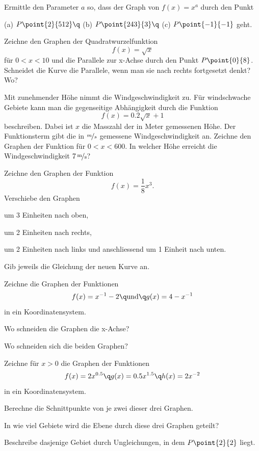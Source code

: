 \documentclass[%
11pt,%
twoside,%
titlepage,%
german,%
headsepline%
]{scrartcl}
\begin{document}
\begin{ueb}[Wurzeln]
Ermittle den Parameter $a$ so, dass der Graph von $f(x)=x^a$ durch den Punkt

(a) $P\point{2}{512}\q$ (b) $P\point{243}{3}\q$ (c) $P\point{-1}{-1}$
geht.
\end{ueb}

\begin{ueb}[Graphen 3]
Zeichne den Graphen der Quadratwurzelfunktion
$$f(x)=\sqrt{x}$$
für $0<x<10$ und die Parallele zur x-Achse durch den Punkt $P\point{0}{8}$. Schneidet die Kurve die Parallele, wenn man sie nach rechts fortgesetzt denkt? Wo?
\end{ueb}

\begin{ueb}[Wind]
Mit zunehmender Höhe nimmt die Windgeschwindigkeit zu. Für windschwache Gebiete kann man die gegenseitige Abhängigkeit durch die Funktion
$$f(x)=0.2\sqrt{x}+1$$
beschreiben. Dabei ist $x$ die Masszahl der in Meter gemessenen Höhe. Der Funktionsterm gibt die in $\nicefrac{m}{s}$ gemessene Windgeschwindigkeit an. Zeichne den Graphen der Funktion für $0<x<600$. In welcher Höhe erreicht die Windgeschwindigkeit $\unitfrac[7]{m}{s}$?
\end{ueb}

\begin{ueb}[Verschieben]
Zeichne den Graphen der Funktion
$$f(x)=\frac{1}{8}x^3.$$
Verschiebe den Graphen
\begin{enumeratea}
\item um 3 Einheiten nach oben,
\item um 2 Einheiten nach rechts,
\item um 2 Einheiten nach links und anschliessend um
1 Einheit nach unten.
\end{enumeratea}
Gib jeweils die Gleichung der neuen Kurve an.
\end{ueb}

\begin{ueb}[Schnittpunkte]
Zeichne die Graphen der Funktionen
$$f(x)=x^{-1}-2\q\text{und}\q g(x)=4-x^{-1}$$
in ein Koordinatensystem.
\begin{enumeratea}
\item Wo schneiden die Graphen die x-Achse?
\item Wo schneiden sich die beiden Graphen?
\end{enumeratea}
\end{ueb}

\begin{ueb}[Gebiete]
Zeichne für $x >0$ die Graphen der Funktionen
$$f(x)=2x^{0.5}\q g(x)=0.5x^{1.5}\q h(x)=2x^{-2}$$
in ein Koordinatensystem.
\begin{enumeratea}
\item Berechne die Schnittpunkte von je zwei dieser
drei Graphen.
\item In wie viel Gebiete wird die Ebene durch diese drei
Graphen geteilt?
\item Beschreibe dasjenige Gebiet durch Ungleichungen, in dem $P\point{2}{2}$ liegt.
\end{enumeratea}
\end{ueb}
\end{document}
